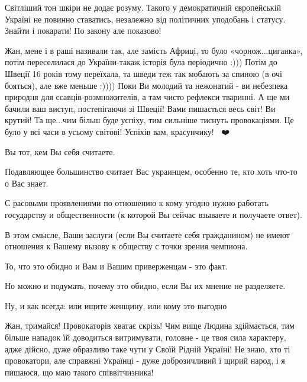 \begin{itemize}
Світліший тон шкіри не додає розуму. Такого у демократичній європейській
Україні не повинно ставатись, незалежно від політичних уподобань і статусу.
Знайти і покарати! По закону але показово!

 

Жан, мене і в раші називали так, але замість Африці, то було
«чорнож...циганка», потім переселилася до України-такаж історія була періодично
:))) Потім до Швеції 16 років тому переїхала, та шведи теж так мобають за
спиною (в очі бояться), але вже меньше :)))) Поки Ви молодий та нежонатий - ви
небезпека природня для ссавців-розмножителів, а там чисто рефлекси тваринні. А
ще ми бачили ваш виступ, постепігаючи зі Швеції! Вами пишається весь світ! Ви
крутий! Та ще...чим більш буде успіху, тим сильніше тиснуть провокаціями. Це
було у всі часи в усьому світові! Успіхів вам, красунчику! 🙏🏻❤️

 

Вы тот, кем Вы себя считаете.

Подавляющее большинство считает Вас украинцем, особенно те, кто хоть что-то о
Вас знает.

С расовыми проявлениями по отношению к кому угодно нужно работать государству и
общественности (к которой Вы сейчас взываете и получаете ответ).

В этом смысле, Ваши заслуги (если Вы считаете себя гражданином) не имеют
отношения к Вашему вызову к обществу с точки зрения чемпиона.

То, что это обидно и Вам и Вашим приверженцам - это факт.

Но можно и подумать, почему это обидно, если Вы их мнение не разделяете.

Ну, и как всегда: или ищите женщину, или кому это выгодно \Smiley[1.0][yellow]


Жан, тримайся! Провокаторів хватає скрізь! Чим вище Людина здіймається, тим
більше нападок їй доводиться витримувати, головне - це твоя сила характеру,
адже дійсно, дуже образливо таке чути у Своїй Рідній Україні! Не знаю, хто ті
провокатори, але справжні Українці - дуже доброзичливий і щирий народ, і я
пишаюся, що маю такого співвітчизника!


\end{itemize}
